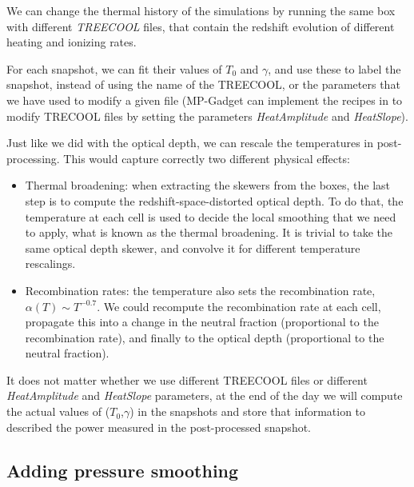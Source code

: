 We can change the thermal history of the simulations by running the same box
with different \textit{TREECOOL} files, that contain the redshift evolution
of different heating and ionizing rates.

For each snapshot, we can fit their values of $T_0$ and $\gamma$, and use 
these to label the snapshot, instead of using the name of the TREECOOL, 
or the parameters that we have used to modify a given file 
(MP-Gadget can implement the recipes in \cite{Bolton2008} to modify TRECOOL
files by setting the parameters \textit{HeatAmplitude} and \textit{HeatSlope}).

Just like we did with the optical depth, we can rescale the temperatures in 
post-processing. 
This would capture correctly two different physical effects:
\begin{itemize}
 \item Thermal broadening: when extracting the skewers from the boxes, 
  the last step is to compute the redshift-space-distorted optical depth. 
  To do that, the temperature at each cell is used to decide the local 
  smoothing that we need to apply, what is known as the thermal broadening. 
  It is trivial to take the same optical depth skewer, and convolve it for
  different temperature rescalings.
 \item Recombination rates: the temperature also sets the recombination rate,
  $\alpha(T) \sim T^{-0.7}$. 
  We could recompute the recombination rate at each cell, 
  propagate this into a change in the neutral fraction (proportional to the 
  recombination rate), and finally to the optical depth (proportional to the 
  neutral fraction).
\end{itemize}

It does not matter whether we use different TREECOOL files or different
\textit{HeatAmplitude} and \textit{HeatSlope} parameters, at the end of the
day we will compute the actual values of ($T_0$,$\gamma$) in the snapshots
and store that information to described the power measured in the
post-processed snapshot.


\subsection{Adding pressure smoothing}

